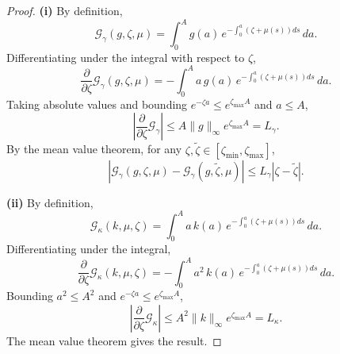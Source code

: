 \documentclass[journal,twoside,web]{ieeecolor}
\begin{document}
\begin{proof}
\textbf{(i)} By definition,
\begin{equation}
\mathcal{G}_\gamma(g,\zeta,\mu) = \int_0^A g(a)\,e^{-\int_0^a(\zeta+\mu(s))ds}\,da.
\end{equation}
Differentiating under the integral with respect to $\zeta$,
\begin{equation}
\frac{\partial}{\partial\zeta}\mathcal{G}_\gamma(g,\zeta,\mu) = -\int_0^A a\,g(a)\,e^{-\int_0^a(\zeta+\mu(s))ds}\,da.
\end{equation}
Taking absolute values and bounding $e^{-\zeta a} \leq e^{\zeta_{\max}A}$ and $a \leq A$,
\begin{equation}
\left|\frac{\partial}{\partial\zeta}\mathcal{G}_\gamma\right| \leq A\|g\|_\infty e^{\zeta_{\max}A} = L_\gamma.
\end{equation}
By the mean value theorem, for any $\zeta,\tilde\zeta \in [\zeta_{\min},\zeta_{\max}]$,
\begin{equation}
|\mathcal{G}_\gamma(g,\zeta,\mu) - \mathcal{G}_\gamma(g,\tilde\zeta,\mu)| \leq L_\gamma|\zeta-\tilde\zeta|.
\end{equation}

\textbf{(ii)} By definition,
\begin{equation}
\mathcal{G}_\kappa(k,\mu,\zeta) = \int_0^A a\,k(a)\,e^{-\int_0^a(\zeta+\mu(s))ds}\,da.
\end{equation}
Differentiating under the integral,
\begin{equation}
\frac{\partial}{\partial\zeta}\mathcal{G}_\kappa(k,\mu,\zeta) = -\int_0^A a^2\,k(a)\,e^{-\int_0^a(\zeta+\mu(s))ds}\,da.
\end{equation}
Bounding $a^2 \leq A^2$ and $e^{-\zeta a} \leq e^{\zeta_{\max}A}$,
\begin{equation}
\left|\frac{\partial}{\partial\zeta}\mathcal{G}_\kappa\right| \leq A^2\|k\|_\infty e^{\zeta_{\max}A} = L_\kappa.
\end{equation}
The mean value theorem gives the result.


\end{proof}
\end{document}
